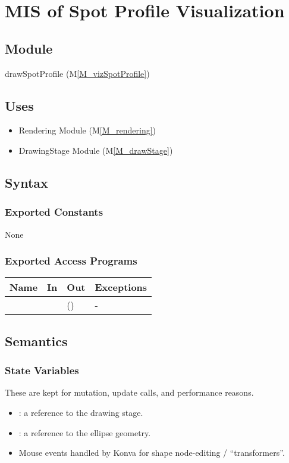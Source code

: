 \documentclass[12pt, titlepage]{article}
\newcommand{\mref}[1]{M\ref{#1}}
\newcommand{\mrefp}[1]{(\mref{#1})}
\newcommand{\mreff}[1]{Module \mrefp{#1}}
\begin{document}
\newpage




\section{MIS of Spot Profile Visualization} \label{MS_vizSpotProfile}

\subsection{Module}
drawSpotProfile \mrefp{M_vizSpotProfile}

\subsection{Uses}
\begin{itemize}
  \item Rendering \mreff{M_rendering}
  \item DrawingStage \mreff{M_drawStage}
\end{itemize}

\subsection{Syntax}

\subsubsection{Exported Constants}
None
\subsubsection{Exported Access Programs}

\begin{center}
\begin{tabular}{L{5cm} L{4cm} L{4cm} L{2cm}}
\hline
\textbf{Name} & \textbf{In} & \textbf{Out} & \textbf{Exceptions} \\
\hline
{} &  &  () & - \\
\hline
\end{tabular}
\end{center}

\subsection{Semantics}

\subsubsection{State Variables}
These are kept for mutation, update calls, and performance reasons.
\begin{itemize}
  \item {}: a reference to the drawing stage.
  \item {}: a reference to the ellipse geometry.
  \item Mouse events handled by Konva for shape node-editing / ``transformers''.
\end{itemize}
\end{document}
